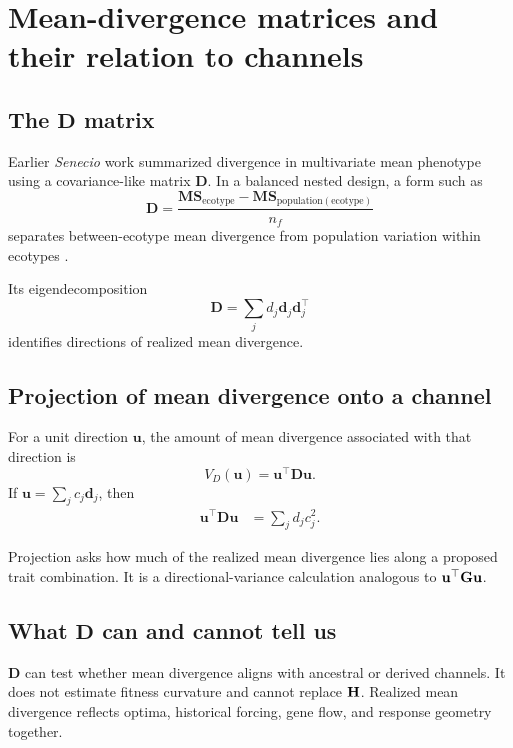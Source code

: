 \chapter{Mean-divergence matrices and their relation to channels}

\section{The \(\mathbf D\) matrix}

Earlier \textit{Senecio} work summarized divergence in multivariate mean phenotype using a covariance-like matrix \(\mathbf D\). In a balanced nested design, a form such as
\begin{equation}
\mathbf D=\frac{\mathbf{MS}_{\mathrm{ecotype}}-\mathbf{MS}_{\mathrm{population(ecotype)}}}{n_f}
\end{equation}
separates between-ecotype mean divergence from population variation within ecotypes \cite{walter2018}.

Its eigendecomposition
\begin{equation}
\mathbf D=\sum_jd_j\mathbf d_j\mathbf d_j^\top
\end{equation}
identifies directions of realized mean divergence.

\section{Projection of mean divergence onto a channel}

For a unit direction \(\mathbf u\), the amount of mean divergence associated with that direction is
\begin{equation}
V_D(\mathbf u)=\mathbf u^\top\mathbf D\mathbf u.
\label{eq:Dprojection}
\end{equation}
If \(\mathbf u=\sum_jc_j\mathbf d_j\), then
\begin{align}
\mathbf u^\top\mathbf D\mathbf u
&=\sum_jd_jc_j^2.
\end{align}

\inwords Projection asks how much of the realized mean divergence lies along a proposed trait combination. It is a directional-variance calculation analogous to \(\mathbf u^\top\mathbf{G}\mathbf u\).

\section{What \(\mathbf D\) can and cannot tell us}

\(\mathbf D\) can test whether mean divergence aligns with ancestral or derived channels. It does not estimate fitness curvature and cannot replace \(\mathbf{H}\). Realized mean divergence reflects optima, historical forcing, gene flow, and response geometry together.

